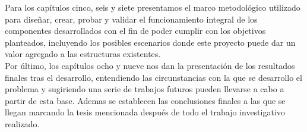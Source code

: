Para los capítulos cinco, seis y siete presentamos el marco metodológico utilizado para diseñar, crear, probar y validar el funcionamiento integral de los componentes desarrollados con el fin de poder cumplir con los objetivos planteados, incluyendo los posibles escenarios donde este proyecto puede dar un valor agregado a las estructuras existentes. \\
 
Por último, los capítulos ocho y nueve nos dan la presentación de los resultados finales tras el desarrollo, entendiendo las circunstancias con la que se desarrollo el problema y sugiriendo una serie de trabajos futuros pueden llevarse a cabo a partir de esta base. Ademas se establecen las conclusiones finales a las que se llegan marcando la tesis mencionada después de todo el trabajo investigativo realizado. \\
